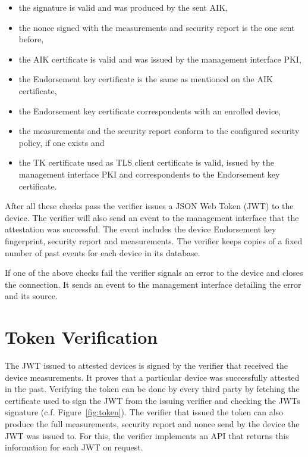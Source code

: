 \documentclass[a4paper,oneside,10pt,extrafontsizes]{memoir}
\begin{document}
\begin{itemize}
  \item the signature is valid and was produced by the sent AIK,
  \item the nonce signed with the measurements and security report is the one
    sent before,
  \item the AIK certificate is valid and was issued by the management interface
    PKI,
  \item the Endorsement key certificate is the same as mentioned on the AIK
    certificate,
  \item the Endorsement key certificate correspondents with an enrolled device,
  \item the measurements and the security report conform to the configured
    security policy, if one exists and
  \item the TK certificate used as TLS client certificate is valid, issued by
    the management interface PKI and correspondents to the Endorsement key
    certificate.
\end{itemize}

After all these checks pass the verifier issues a JSON Web Token (JWT) to the
device. The verifier will also send an event to the management interface that
the attestation was successful. The event includes the device Endorsement key
fingerprint, security report and measurements. The verifier keeps copies of a
fixed number of past events for each device in its database.

If one of the above checks fail the verifier signals an error to the device and
closes the connection. It sends an event to the management interface detailing
the error and its source.

\pagebreak

\section{Token Verification}
\label{sec:validate}

The JWT issued to attested devices is signed by the verifier that received the
device measurements. It proves that a particular device was successfully
attested in the past. Verifying the token can be done by every third party by
fetching the certificate used to sign the JWT from the issuing verifier and
checking the JWTs signature (c.f. Figure~\ref{fig:token}). The verifier that
issued the token can also produce the full measurements, security report and
nonce send by the device the JWT was issued to. For this, the verifier
implements an API that returns this information for each JWT on request.
\end{document}
